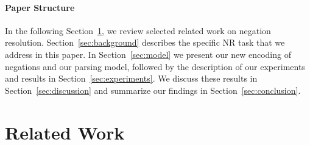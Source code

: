 \documentclass[11pt,a4paper]{article}
\theoremstyle{plain}
\begin{document}
\paragraph{Paper Structure}
In the following Section~\ref{sec:related}, we review selected related work
on negation resolution.
Section~\ref{sec:background} describes the specific NR task that we address in this paper.
In Section~\ref{sec:model} we present our new encoding of negations and our
parsing model, followed by the description of our experiments and results in
Section~\ref{sec:experiments}.
We discuss these results in Section~\ref{sec:discussion} and summarize our findings in
Section~\ref{sec:conclusion}.


\section{Related Work}
\label{sec:related}

\end{document}
